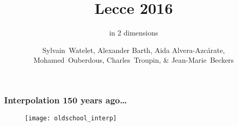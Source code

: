 
\parindent 0cm

\author[Sylvain~Watelet, Alexander Barth, Aida Alvera-Azc\'{a}rate, Mohamed~Ouberdous, Charles~Troupin \& Jean-Marie~Beckers]{Sylvain~Watelet, Alexander Barth, Aida Alvera-Azc\'{a}rate,\\ Mohamed~Ouberdous,
 Charles~Troupin, \& Jean-Marie~Beckers}
  
\title[]{\diva Lecce 2016}
\subtitle{\diva in 2 dimensions}
\date{}


\maketitlepage %

\begin{frame}
\frametitle{Interpolation 150 years ago\ldots}

\begin{figure}[H]
\centering
\texttt{[image: oldschool\_interp]}
\end{figure}


\end{frame}

